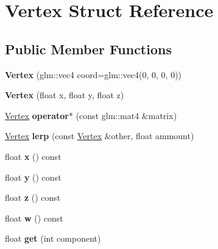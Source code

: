 \hypertarget{struct_vertex}{}\section{Vertex Struct Reference}
\label{struct_vertex}
\subsection*{Public Member Functions}
\begin{DoxyCompactItemize}
\item 
\hypertarget{struct_vertex_a314b0e4370b7b33efdaa4bf492b91021}{}{\bfseries Vertex} (glm\+::vec4 coord=glm\+::vec4(0, 0, 0, 0))\label{struct_vertex_a314b0e4370b7b33efdaa4bf492b91021}

\item 
\hypertarget{struct_vertex_a2c558c054a0a2c970588c063073803a0}{}{\bfseries Vertex} (float x, float y, float z)\label{struct_vertex_a2c558c054a0a2c970588c063073803a0}

\item 
\hypertarget{struct_vertex_a7b6c5132e8fd35a45481d8ba1e96d981}{}\hyperlink{struct_vertex}{Vertex} {\bfseries operator$\ast$} (const glm\+::mat4 \&matrix)\label{struct_vertex_a7b6c5132e8fd35a45481d8ba1e96d981}

\item 
\hypertarget{struct_vertex_ae3ede62e3d8f7614bead7becbeed065e}{}\hyperlink{struct_vertex}{Vertex} {\bfseries lerp} (const \hyperlink{struct_vertex}{Vertex} \&other, float ammount)\label{struct_vertex_ae3ede62e3d8f7614bead7becbeed065e}

\item 
\hypertarget{struct_vertex_a5aeac850629b2391834b1ea862cd3165}{}float {\bfseries x} () const \label{struct_vertex_a5aeac850629b2391834b1ea862cd3165}

\item 
\hypertarget{struct_vertex_ab7cbabc42312a9494a6889a0106889a2}{}float {\bfseries y} () const \label{struct_vertex_ab7cbabc42312a9494a6889a0106889a2}

\item 
\hypertarget{struct_vertex_ad643c72d7d0edb4763fa5de716e17228}{}float {\bfseries z} () const \label{struct_vertex_ad643c72d7d0edb4763fa5de716e17228}

\item 
\hypertarget{struct_vertex_a3b549b8c60d7530358e941a390196c54}{}float {\bfseries w} () const \label{struct_vertex_a3b549b8c60d7530358e941a390196c54}

\item 
\hypertarget{struct_vertex_a9859cbbdd117fb2b59f56966f8a93e6e}{}float {\bfseries get} (int component)\label{struct_vertex_a9859cbbdd117fb2b59f56966f8a93e6e}

\end{DoxyCompactItemize}
